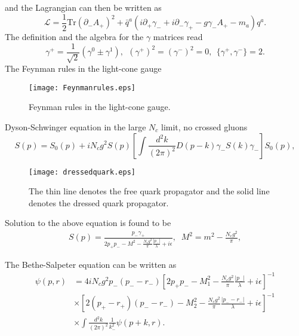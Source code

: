 \documentclass[8pt]{beamer}
\begin{document}
\begin{frame}
	and the Lagrangian can then be written as
	\begin{equation}
		\mathcal{L}=\frac{1}{2}\mbox{Tr}(\partial_{-}A_{+})^2+\bar
		q^a(i\partial_{+}\gamma_{-}+i\partial_{-}\gamma_{+}-g\gamma_{-}A_{+}-m_a)q^a.
	\end{equation}
	The definition and the algebra for the $\gamma$ matrices read
	\begin{equation}
		\gamma^{+}=\frac{1}{\sqrt{2}}(\gamma^0\pm \gamma^1),\ \
		(\gamma^+)^2=(\gamma^-)^2=0,\ \ \{\gamma^+,\gamma^-\}=2.
	\end{equation}
	The Feynman rules in the light-cone gauge
	\begin{figure}[hbt]
		\begin{center}
			\texttt{[image: Feynmanrules.eps]}\\
			\caption{Feynman rules in the light-cone gauge.}\label{Feynmanrules}
		\end{center}
	\end{figure}

\end{frame}

\begin{frame}
	Dyson-Schwinger equation in the large $N_c$ limit, no crossed gluons
	\begin{equation}
		S(p)=S_0(p)+i N_c g^2
		S(p)\left[\int\frac{d^2k}{(2\pi)^2}D(p-k)\gamma_{-}S(k)\gamma_{-}\right]S_{0}(p),
	\end{equation}
	\begin{figure}[hbt]
		\begin{center}
			\texttt{[image: dressedquark.eps]}\\
			\caption{The thin line denotes the free quark propagator and the solid line denotes the dressed quark propagator.}\label{dressedquark}
		\end{center}
	\end{figure}
	Solution to the above equation is found to be
	\begin{eqnarray}
		S(p)=\frac{p_{-}\gamma_{+}}{2p_{+}p_{-}-M^2-\frac{N_c
			g^2}{\pi}\frac{|p_{-}|}{\lambda}+i\epsilon}, \;\;
		M^2=m^2-\frac{N_c g^2}{\pi},
	\end{eqnarray}

	The Bethe-Salpeter equation can be written as
	\begin{align}
		\psi(p,r) & =4iN_c g^2 p_{-}(p_{-}-r_{-})
		[2p_{+}p_{-}-M_1^2-\frac{N_cg^2}{\pi}\frac{|p_{-}|}{\lambda}+i\epsilon]^{-1}\nonumber\\
		          & \times [2(p_{+}-r_{+})(p_{-}-r_{-})-M_2^2-\frac{N_c
			g^2}{\pi}\frac{|p_{-}-r_{-}|}{\lambda}+i\epsilon]^{-1}\nonumber\\&
		\times
		\int\frac{d^2k}{(2\pi)^2}\frac{1}{k_{-}^2}\psi(p+k,r).\label{BS}
	\end{align}
\end{frame}
\end{document}
